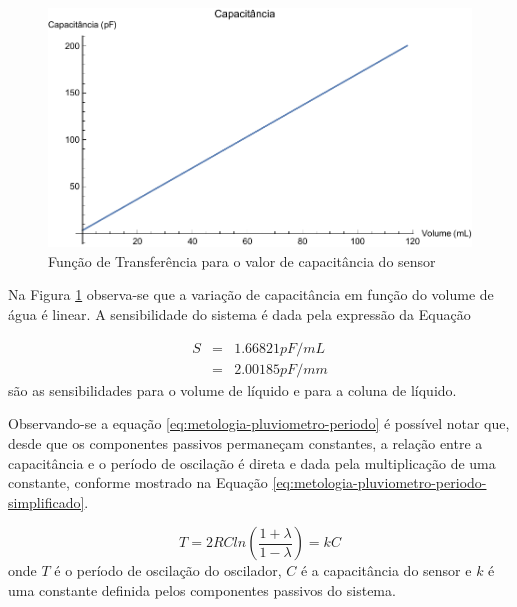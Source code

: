 \documentclass[a4paper]{instrumentacao}
\begin{document}
\begin{figure}[H]
	\centering
	\includegraphics[width=\textwidth]{Nivel/Teorico/Capacitancia.pdf}
	\caption{Função de Transferência para o valor de capacitância do sensor}
	\label{fig:metodologia-pluviometro-teorico-capacitancia}
\end{figure}

Na Figura \ref{fig:metodologia-pluviometro-teorico-capacitancia} observa-se que a variação de capacitância em função do volume de água é linear. A sensibilidade do sistema é dada pela expressão da Equação \label{eq:metodologia-pluviometro-teorico-capacitancia-sensibilidade}

\begin{eqnarray}
	S &=& 1.66821 pF/mL \\
	  &=& 2.00185 pF/mm \nonumber
	\label{eq:metodologia-pluviometro-teorico-capacitancia-sensibilidade}
\end{eqnarray}
\noindent são as sensibilidades para o volume de líquido e para a coluna de líquido.

Observando-se a equação \ref{eq:metologia-pluviometro-periodo} é possível notar que, desde que os componentes passivos permaneçam constantes, a relação entre a capacitância e o período de oscilação é direta e dada pela multiplicação de uma constante, conforme mostrado na Equação \ref{eq:metologia-pluviometro-periodo-simplificado}.

\begin{equation}
	T = 2 R C ln \left(\frac{1+\lambda}{1-\lambda}\right) = k C
	\label{eq:metologia-pluviometro-periodo-simplificado}
\end{equation}
\noindent onde $T$ é o período de oscilação do oscilador, $C$ é a capacitância do sensor e $k$ é uma constante definida pelos componentes passivos do sistema.
\end{document}
